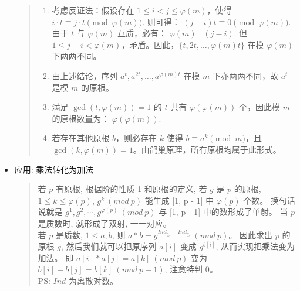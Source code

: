 \documentclass[a4paper,12pt]{article}
\begin{document}
\begin{itemize}
\begin{quote}
\begin{enumerate}
            \item 
            考虑反证法：假设存在 \( 1 \leq i < j \leq \varphi(m) \)，使得
            \(
            i \cdot t \equiv j \cdot t \pmod{\varphi(m)}.
            \)
            则可得：
            \(
            (j - i)t \equiv 0 \pmod{\varphi(m)}.
            \)
            由于 \( t \) 与 \(\varphi(m)\) 互质，必有：
            \(
            \varphi(m) \mid (j - i).
            \)
            但 \( 1 \leq j - i < \varphi(m) \)，矛盾。因此，\( \{ t, 2t, \ldots, \varphi(m)t \} \) 在模 \(\varphi(m)\) 下两两不同。
        
            \item 
            由上述结论，序列 \( a^{t}, a^{2t}, \ldots, a^{\varphi(m)t} \) 在模 \( m \) 下亦两两不同，故 \( a^t \) 是模 \( m \) 的原根。
        
            \item 
            满足 \( \gcd(t, \varphi(m)) = 1 \) 的 \( t \) 共有 \(\varphi(\varphi(m))\) 个，因此模 \( m \) 的原根数量为：
            \(
            \varphi(\varphi(m)).
            \)
        
            \item 
            若存在其他原根 \( b \)，则必存在 \( k \) 使得 \( b \equiv a^k \pmod{m} \)，且 \( \gcd(k, \varphi(m)) = 1 \)。由鸽巢原理，所有原根均属于此形式。
        \end{enumerate}
    \end{quote}
\item 
    应用: 乘法转化为加法
    \begin{quote}
        若 \(p\) 有原根, 根据阶的性质 1 和原根的定义, 若 \(g\) 是 \(p\) 的原根, \(1 \leq k \leq \varphi(p)\),
        \(g^k \ (mod \ p)\) 能生成 [1, p - 1] 中 \(\varphi(p)\) 个数。
        换句话说就是 \(g^1, g^2, \cdots, g^{\varphi(p)} \ (mod \ p)\) 与 [1, p - 1] 中的数形成了单射。
        当 \(p\) 是质数时, 就形成了双射, 一一对应。 \\

        若 \(p\) 是质数, \(1 \leq a,b\), 则 \(a * b = g^{Ind_{g_a}+Ind_{g_b}} \ (mod \ p)\)。
        因此求出 \(p\) 的原根 \(g\), 然后我们就可以把原序列 \(a[i]\) 变成 \(g^{b[i]}\), 从而实现把乘法变为加法。
        即 \(a[i]*a[j]=a[k] \ (mod \ p)\) 变为 \(b[i] + b[j] = b[k] \ (mod \ p-1)\), 注意特判 0。\\

        PS: \(Ind\) 为离散对数。
    \end{quote}
\end{itemize}
\end{document}
